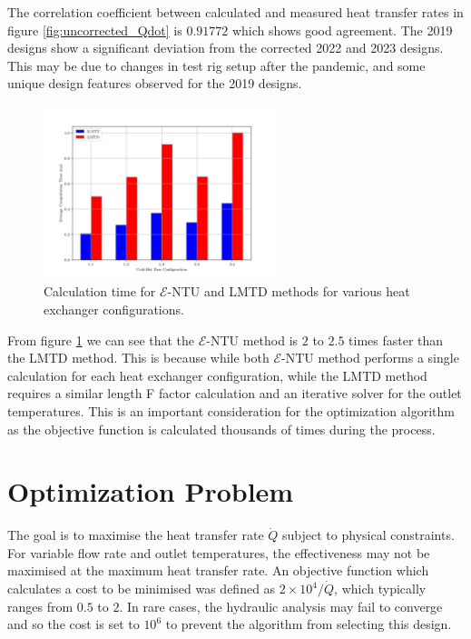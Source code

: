 \documentclass{article}
\begin{document}
The correlation coefficient between calculated and measured heat transfer rates in figure \ref{fig:uncorrected_Qdot} is $\mathbf{0.91772}$ which shows good agreement.
The 2019 designs show a significant deviation from the corrected 2022 and 2023 designs.
This may be due to changes in test rig setup after the pandemic, and some unique design features observed for the 2019 designs.

\begin{figure}[H]
  \centering
  \includegraphics[width=0.6\textwidth]{entu_lmtd_speed.png}
  \caption{Calculation time for $\mathcal{E}$-NTU and LMTD methods for various heat exchanger configurations.}
  \label{fig:entu_lmtd_speed}
\end{figure}

From figure \ref{fig:entu_lmtd_speed} we can see that the $\mathcal{E}$-NTU method is $2$ to $2.5$ times faster than the LMTD method.
This is because while both $\mathcal{E}$-NTU method performs a single calculation for each heat exchanger configuration, while the LMTD method requires a similar length F factor calculation and an iterative solver for the outlet temperatures.
This is an important consideration for the optimization algorithm as the objective function is calculated thousands of times during the process.


\section{Optimization Problem}

The goal is to maximise the heat transfer rate $\dot{Q}$ subject to physical constraints. For variable flow rate and outlet temperatures, the effectiveness may not be maximised at the maximum heat transfer rate.
An objective function which calculates a cost to be minimised was defined as $2\times10^4 /\dot{Q}$, which typically ranges from $0.5$ to $2$.
In rare cases, the hydraulic analysis may fail to converge and so the cost is set to $10^6$ to prevent the algorithm from selecting this design.
\end{document}
